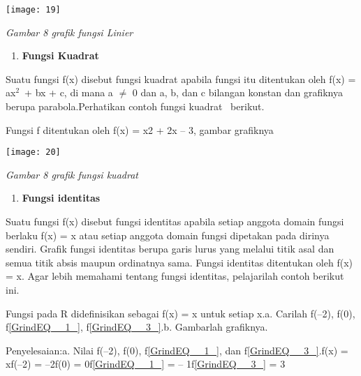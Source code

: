 \documentclass[11pt,fleqn]{book} %
\begin{document}
\begin{myEnumerate}
\begin{itemize}
\begin{center}
\noindent \texttt{[image: 19]}
\end{center}

\noindent \textit{Gambar 8 grafik fungsi Linier}

\noindent 

\noindent 

\begin{enumerate}
\item  \textbf{Fungsi Kuadrat}
\end{enumerate}

\noindent 

\noindent Suatu fungsi f(x) disebut fungsi kuadrat apabila fungsi itu ditentukan oleh f(x) = ax${}^{2}$~+ bx + c, di mana a $\mathrm{\neq}$ 0 dan a, b, dan c bilangan konstan dan grafiknya berupa parabola.Perhatikan contoh fungsi kuadrat ~berikut.

Fungsi f ditentukan oleh f(x) = x2 + 2x -- 3, gambar grafiknya

\begin{center}
\noindent \texttt{[image: 20]}
\end{center}

\textit{     Gambar 8 grafik fungsi kuadrat}

\textbf{\textit{}}

\begin{enumerate}
\item \textbf{\textit{ }Fungsi identitas}
\end{enumerate}

\noindent \textbf{}

\noindent Suatu fungsi f(x) disebut fungsi identitas apabila setiap anggota domain fungsi berlaku f(x) = x atau setiap anggota domain fungsi dipetakan pada dirinya sendiri. Grafik fungsi identitas berupa garis lurus yang melalui titik asal dan semua titik absis maupun ordinatnya sama. Fungsi identitas ditentukan oleh f(x) = x. Agar lebih memahami tentang fungsi identitas, pelajarilah contoh berikut ini.

\noindent Fungsi pada R didefinisikan sebagai f(x) = x untuk setiap x.a. Carilah f(--2), f(0), f\eqref{GrindEQ__1_}, f\eqref{GrindEQ__3_}.b. Gambarlah grafiknya.

\noindent Penyelesaian:a. Nilai f(--2), f(0), f\eqref{GrindEQ__1_}, dan f\eqref{GrindEQ__3_}.f(x) = xf(--2) = --2f(0) = 0f\eqref{GrindEQ__1_} = -- 1f\eqref{GrindEQ__3_} = 3


\end{itemize}
\end{myEnumerate}
\end{document}
